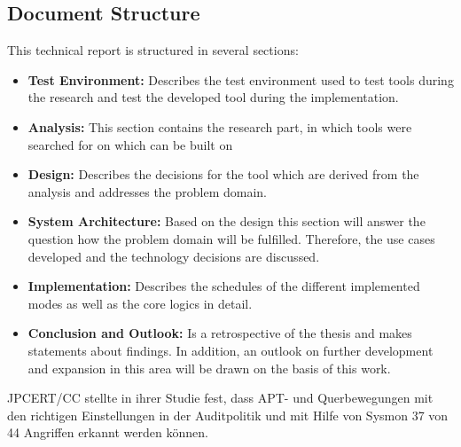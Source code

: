 \subsection{Document Structure}
This technical report is structured in several sections:
\begin{itemize}
    \item \textbf{Test Environment:} Describes the test environment used to test tools during the research and test the developed tool during the implementation.
    \item \textbf{Analysis:} This section contains the research part, in which tools were searched for on which can be built on
    \item \textbf{Design:} Describes the decisions for the tool which are derived from the analysis and addresses the problem domain.
    \item \textbf{System Architecture:} Based on the design this section will answer the question how the problem domain will be fulfilled. Therefore, the use cases developed and the technology decisions are discussed.
    \item \textbf{Implementation:} Describes the schedules of the different implemented modes as well as the core logics in detail.
    \item \textbf{Conclusion and Outlook:} Is a retrospective of the thesis and makes statements about findings. In addition, an outlook on further development and expansion in this area will be drawn on the basis of this work.
\end{itemize}JPCERT/CC stellte in ihrer Studie fest, dass APT- und Querbewegungen mit den richtigen Einstellungen in der Auditpolitik und mit Hilfe von Sysmon 37 von 44 Angriffen erkannt werden können.